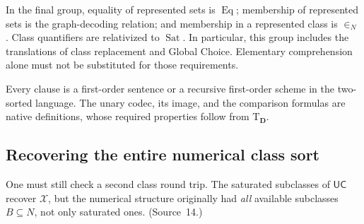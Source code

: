 \documentclass[11pt,letterpaper]{article}
\theoremstyle{definition}
\theoremstyle{remark}
\newcommand{\Eqc}{\operatorname{Eq}}
\newcommand{\Sat}{\operatorname{Sat}}
\newcommand{\UC}{\mathsf{UC}}
\newcommand{\Dd}{\mathbf{D}}
\newcommand{\Tth}{\mathrm{T}}
\begin{document}
In the final group, equality of represented sets is $\Eqc$; membership of
represented sets is the graph-decoding relation; and membership in a represented
class is $\in_N$. Class quantifiers are relativized to $\Sat$. In particular, this
group includes the translations of class replacement and Global Choice. Elementary
comprehension alone must not be substituted for those requirements.

Every clause is a first-order sentence or a recursive first-order scheme in the
two-sorted language. The unary codec, its image, and the comparison formulas are
native definitions, whose required properties follow from $\Tth_{\Dd}$.

\subsection{Recovering the entire numerical class sort}

One must still check a second class round trip. The saturated subclasses of $\UC$
recover $\mathcal X$, but the numerical structure originally had \emph{all}
available subclasses $B\subseteq N$, not only saturated ones. (Source~14.)
\end{document}

